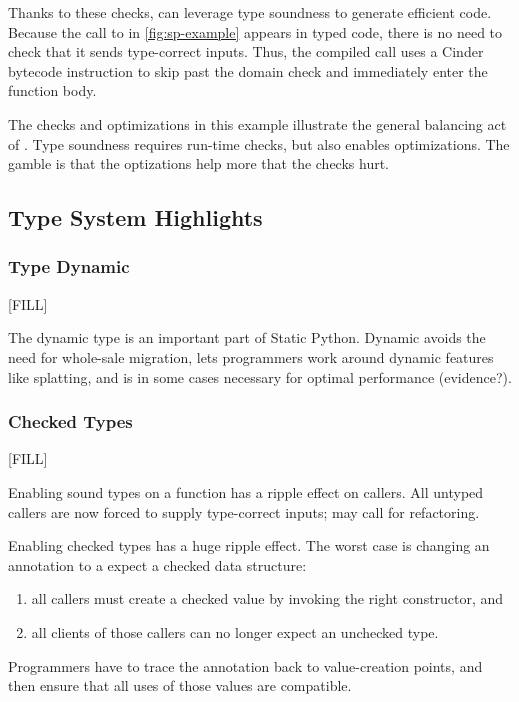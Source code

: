 \documentclass[a4paper,english,cleveref,autoref,thm-restate,anonymous,]{lipics-v2021}
\begin{document}
Thanks to these checks, \SP{} can leverage type soundness to generate efficient code.
Because the call to  in \cref{fig:sp-example} appears in typed code,
there is no need to check that it sends type-correct inputs.
Thus, the compiled call uses a Cinder bytecode instruction to skip past the
domain check and immediately enter the function body.

The checks and optimizations in this example illustrate the general balancing act
of \SP{}.
Type soundness requires run-time checks, but also enables optimizations.
The gamble is that the optizations help more that the checks hurt.


\subsection{Type System Highlights}

\subsubsection{Type Dynamic}

[FILL]

The dynamic type is an important part of Static Python.
Dynamic avoids the need for whole-sale migration,
lets programmers work around dynamic features like splatting,
and is in some cases necessary for optimal performance (evidence?).


\subsubsection{Checked Types}

[FILL]

Enabling sound types on a function has a ripple effect on callers.
All untyped callers are now forced to supply type-correct inputs; may call for
refactoring.

Enabling checked types has a huge ripple effect.
The worst case is changing an annotation to a expect a checked data structure:
\begin{enumerate}
  \item all callers must create a checked value by invoking the right constructor, and
  \item all clients of those callers can no longer expect an unchecked type.
\end{enumerate}
Programmers have to trace the annotation back to value-creation points, and then
ensure that all uses of those values are compatible.
\end{document}
